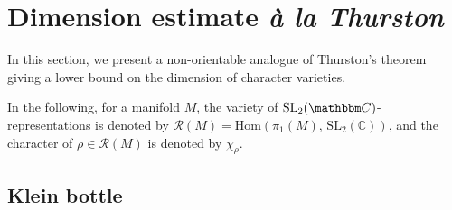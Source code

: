 \documentclass[12pt,reqno]{amsart}
\theoremstyle{definition}
\def\BC{\mathbbm C}
\def\calR{\mathcal R}
\begin{document}
\section{Dimension estimate \emph{\`a la Thurston}}
\label{sec.nonori}



In this section, we present  a non-orientable analogue of Thurston's theorem \cite[Theorem 5.6]{ThurstonNotes} giving a lower bound on the dimension of character varieties. 

In the following, for a manifold $M$, the variety of $\mathrm{SL}_2(\BC)$-representations is denoted by 
$\calR(M)=\mathrm{Hom}(\pi_1(M),\,\mathrm{SL}_2(\mathbb{C}))$, and the character of $\rho \in \calR(M)$ is denoted by $\chi_\rho$.


\subsection{Klein bottle}
\end{document}
